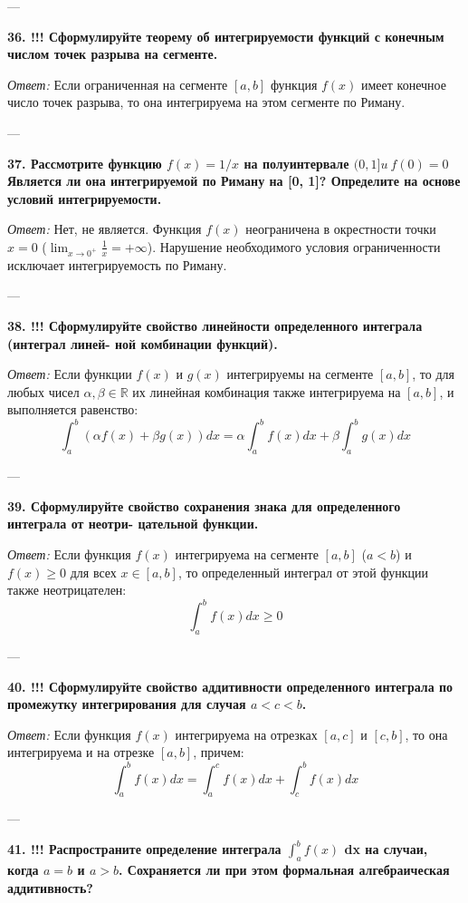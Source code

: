 \documentclass{article}
\begin{document}
---

\textbf{36. !!! Сформулируйте теорему об интегрируемости функций с конечным числом точек разрыва на сегменте.}

\textit{Ответ:} Если ограниченная на сегменте $[a, b]$ функция $f(x)$ имеет конечное число точек разрыва, то она интегрируема на этом сегменте по Риману.

---

\textbf{37. Рассмотрите функцию $f(x)=1/x$ на полуинтервале $(0,1]u~f(0)=0$ Является ли она интегрируемой по Риману на [0, 1]? Определите на основе условий интегрируемости.}

\textit{Ответ:} Нет, не является. Функция $f(x)$ неограничена в окрестности точки $x=0$ ($\lim_{x \to 0^+} \frac{1}{x} = +\infty$). Нарушение необходимого условия ограниченности исключает интегрируемость по Риману.

---

\textbf{38. !!! Сформулируйте свойство линейности определенного интеграла (интеграл линей- ной комбинации функций).}

\textit{Ответ:} Если функции $f(x)$ и $g(x)$ интегрируемы на сегменте $[a, b]$, то для любых чисел $\alpha, \beta \in \mathbb{R}$ их линейная комбинация также интегрируема на $[a, b]$, и выполняется равенство:
$$ \int_a^b (\alpha f(x) + \beta g(x)) dx = \alpha \int_a^b f(x) dx + \beta \int_a^b g(x) dx $$

---

\textbf{39. Сформулируйте свойство сохранения знака для определенного интеграла от неотри- цательной функции.}

\textit{Ответ:} Если функция $f(x)$ интегрируема на сегменте $[a, b]$ ($a < b$) и $f(x) \ge 0$ для всех $x \in [a, b]$, то определенный интеграл от этой функции также неотрицателен:
$$ \int_a^b f(x) dx \ge 0 $$

---

\textbf{40. !!! Сформулируйте свойство аддитивности определенного интеграла по промежутку интегрирования для случая $a<c<b$.}

\textit{Ответ:} Если функция $f(x)$ интегрируема на отрезках $[a, c]$ и $[c, b]$, то она интегрируема и на отрезке $[a, b]$, причем:
$$ \int_a^b f(x) dx = \int_a^c f(x) dx + \int_c^b f(x) dx $$

---

\textbf{41. !!! Распространите определение интеграла $\int_{a}^{b}f(x)$ dx на случаи, когда $a=b$ и $a>b$. Сохраняется ли при этом формальная алгебраическая аддитивность?}
\end{document}
